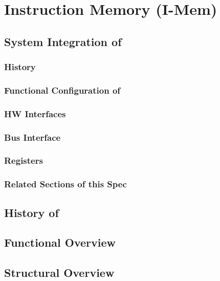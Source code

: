 \section{Instruction Memory (I-Mem)}
\label{sec:imemfunc01}
\subsection{System Integration of \asimem}
\subsubsection{History}


\subsubsection{Functional Configuration of \asimem}


\subsubsection{HW Interfaces}


\subsubsection{Bus Interface}

\subsubsection{Registers}

\subsubsection{Related Sections of this Spec}

\subsection{History of \asimemg}

\subsection{Functional Overview}
\label{subsec:imemfunc01}

\subsection{Structural Overview}

%
%
